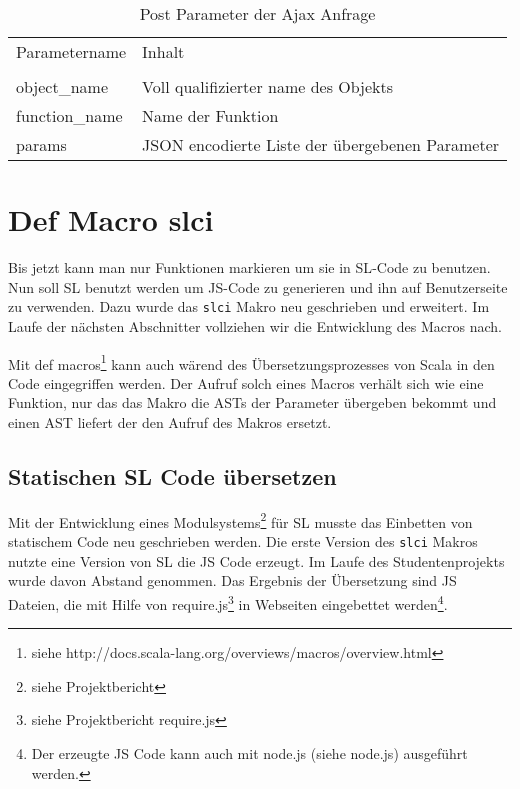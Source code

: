 \documentclass[12pt]{scrreprt}
\begin{document}
\begin{table}[h]
\caption{Post Parameter der Ajax Anfrage}
\centering
\begin{tabular}{ll}
Parametername        &   Inhalt \\
\\
object\_name   & Voll qualifizierter name des Objekts \\
function\_name & Name der Funktion\\
params         & JSON encodierte Liste der übergebenen Parameter\\
\end{tabular}
\label{tab:post-parameter}
\end{table}

\section{Def Macro slci}
\label{sec:inline-macro}

Bis jetzt kann man nur Funktionen markieren um sie in \ac{SL}-Code zu benutzen. Nun soll \ac{SL} benutzt werden um \ac{JS}-Code zu generieren und ihn auf Benutzerseite zu verwenden. Dazu wurde das \lstinline!slci! Makro neu geschrieben und erweitert. Im Laufe der nächsten Abschnitter vollziehen wir die Entwicklung des Macros nach.

Mit def macros\footnote{siehe http://docs.scala-lang.org/overviews/macros/overview.html} kann auch wärend des Übersetzungsprozesses von Scala in den Code eingegriffen werden. Der Aufruf solch eines Macros verhält sich wie eine Funktion, nur das das Makro die \ac{AST}s der Parameter übergeben bekommt und einen \ac{AST} liefert der den Aufruf des Makros ersetzt.

\subsection{Statischen SL Code übersetzen}

Mit der Entwicklung eines Modulsystems\footnote{siehe Projektbericht} für \ac{SL} musste das Einbetten von statischem Code neu geschrieben werden. Die erste Version des \lstinline!slci! Makros nutzte eine Version von \ac{SL} die \ac{JS} Code erzeugt. Im Laufe des Studentenprojekts wurde davon Abstand genommen. Das Ergebnis der Übersetzung sind \ac{JS} Dateien, die mit Hilfe von require.js\footnote{siehe Projektbericht require.js} in Webseiten eingebettet werden\footnote{Der erzeugte \ac{JS} Code kann auch mit node.js (siehe node.js) ausgeführt werden.}.
\end{document}
